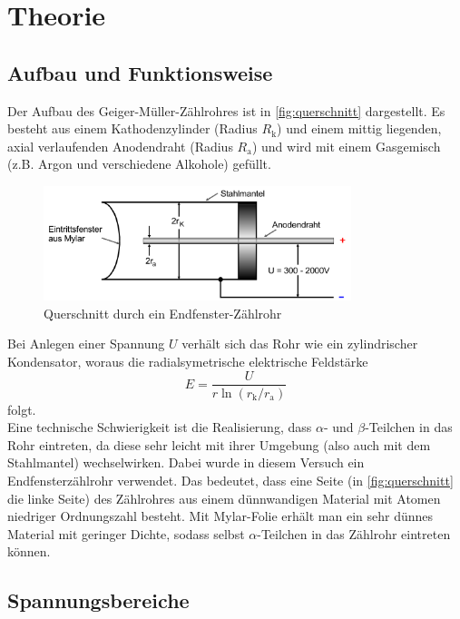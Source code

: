 \section{Theorie}
\label{sec:Theorie}

\subsection{Aufbau und Funktionsweise}
\label{sec:aufbau}

Der Aufbau des Geiger-Müller-Zählrohres ist in \autoref{fig:querschnitt} dargestellt. Es besteht aus
einem Kathodenzylinder (Radius $R_\text{k}$) und einem mittig liegenden, axial verlaufenden
Anodendraht (Radius $R_\text{a}$) und wird mit einem Gasgemisch (z.B. Argon und verschiedene Alkohole) gefüllt.
\begin{figure}[H]
	\centering
	\includegraphics[width=0.8\textwidth]{content/querschnitt.png}
	\caption{Querschnitt durch ein Endfenster-Zählrohr \cite{sample}}
	\label{fig:querschnitt}
\end{figure}
\noindent
Bei Anlegen einer Spannung $U$ verhält sich das Rohr wie ein zylindrischer Kondensator, woraus die 
radialsymetrische elektrische Feldstärke
\begin{equation}
	E = \frac{U}{r \ln(r_\text{k} / r_\text{a})}
	\label{eqn:elektrisches-feld}
\end{equation}
folgt.
\\
Eine technische Schwierigkeit ist die Realisierung, dass $\alpha$- und
$\beta$-Teilchen in das Rohr eintreten, da diese sehr leicht mit ihrer Umgebung (also auch mit dem Stahlmantel)
wechselwirken. Dabei wurde in diesem
Versuch ein Endfensterzählrohr verwendet. Das bedeutet, dass eine Seite (in \autoref{fig:querschnitt} die linke
Seite) des Zählrohres aus einem dünnwandigen Material mit Atomen niedriger Ordnungszahl besteht. Mit Mylar-Folie 
erhält man ein sehr dünnes Material mit geringer Dichte, sodass selbst $\alpha$-Teilchen in das Zählrohr eintreten 
können.

\subsection{Spannungsbereiche}
\label{sec:spannungsbereiche}


